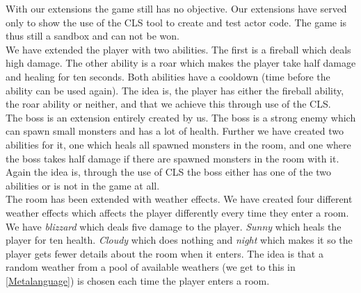 With our extensions the game still has no objective. Our extensions have served only to show the use of the CLS tool to create and test actor code. The game is thus still a sandbox and can not be won.\\
We have extended the player with two abilities. The first is a fireball which deals high damage. The other ability is a roar which makes the player take half damage and healing for ten seconds. Both abilities have a cooldown (time before the ability can be used again). The idea is, the player has either the fireball ability, the roar ability or neither, and that we achieve this through use of the CLS.\\
The boss is an extension entirely created by us. The boss is a strong enemy which can spawn small monsters and has a lot of health. Further we have created two abilities for it, one which heals all spawned monsters in the room, and one where the boss takes half damage if there are spawned monsters in the room with it. Again the idea is, through the use of CLS the boss either has one of the two abilities or is not in the game at all.\\
The room has been extended with weather effects. We have created four different weather effects which affects the player differently every time they enter a room. We have \textit{blizzard} which deals five damage to the player. \textit{Sunny} which heals the player for ten health. \textit{Cloudy} which does nothing and \textit{night} which makes it so the player gets fewer details about the room when it enters. The idea is that a random weather from a pool of available weathers (we get to this in \autoref{Metalanguage}) is chosen each time the player enters a room.\\

